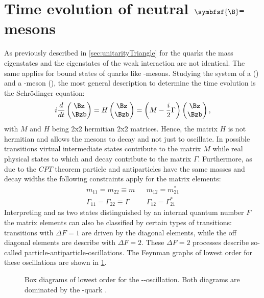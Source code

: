 \section[head={Time evolution of neutral \B-mesons},tocentry={Time evolution of neutral $\symbfsf{\B}$-mesons}]{Time evolution of neutral $\symbfsf{\B}$-mesons}
\label{sec:TimeEvolution}

As previously described in \cref{sec:unitarityTriangle} for the quarks the mass eigenstates and the eigenstates of the weak interaction are not identical.
The same applies for bound states of quarks like \B-mesons. Studying the system of a \Bz (\bquarkbar\dquark) and a \Bzb-meson
(\bquark\dquarkbar), the most general description to determine the time evolution is the Schrödinger equation:
\begin{equation}
i\frac{d}{dt}\begin{pmatrix} \Bz \\ \Bzb \end{pmatrix} = H \begin{pmatrix} \Bz \\ \Bzb \end{pmatrix}
=\left(M-\frac{i}{2}\Gamma\right)\begin{pmatrix} \Bz \\ \Bzb \end{pmatrix}, \label{eq:mixMatrix}
\end{equation}
with $M$ and $H$ being 2x2 hermitian 2x2 matrices.
Hence, the matrix $H$ is not hermitian and allows the \B mesons to decay and not just to oscillate.
In possible transitions virtual intermediate states contribute to the matrix $M$ while real physical states to which \Bz and \Bzb decay contribute to the matrix $\Gamma$.
Furthermore, as due to the $CPT$ theorem particle and antiparticles have the same masses and decay widths the following constraints apply for the matrix elements:
\begin{equation}
\begin{aligned}
&m_{11}=m_{22}\equiv m&&m_{12}=m_{21}^\ast&\\
&\Gamma_{11}=\Gamma_{22}\equiv\Gamma&&\Gamma_{12}=\Gamma_{21}^\ast&
\end{aligned}
\end{equation}
Interpreting \Bz and \Bzb as two states distinguished by an internal quantum number $F$ the matrix elements can also be classified by certain types of transitions:
transitions with $\Delta F=1$ are driven by the diagonal elements, while the off diagonal elements are describe with $\Delta F=2$.
These $\Delta F=2$ processes describe so-called particle-antiparticle-oscillations.
The Feynman graphs of lowest order for these oscillations are shown in \cref{fig:FeynmanMixing}.
\begin{figure}[tbp]
	\centering
	
	\hspace{0.5cm}
	
	\caption{Box diagrams of lowest order for the \Bz-\Bzb-oscillation. Both diagrams are dominated by the \tquark-quark \cite{Ellis:2016jkw}.}
	\label{fig:FeynmanMixing}
\end{figure}


